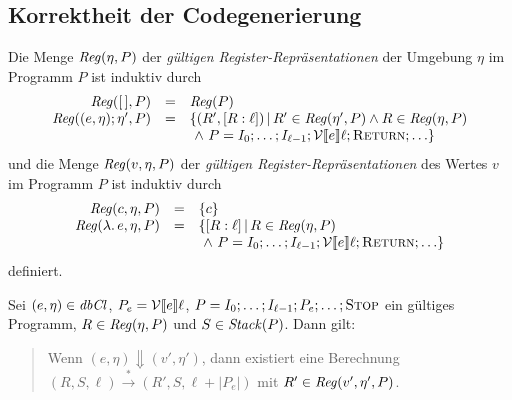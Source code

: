 \documentclass[12pt,fleqn]{article}
\begin{document}
\subsection{Korrektheit der Codegenerierung}

\begin{definition}
  Die Menge ${\text{\it Reg\/}}(\eta,P)$ der {\em g\"ultigen Register-Repr\"asentationen} der Umgebung $\eta$ im Programm $P$ ist
  induktiv durch
  \[\begin{array}{rcl}
    {\text{\it Reg\/}}([\,],P) &=& {\text{\it Reg\/}}(P) \\
    {\text{\it Reg\/}}((e,\eta);\eta',P) &=& \{(R',[R:\ell])\,|\,R'\in{\text{\it Reg\/}}(\eta',P) \wedge R\in{\text{\it Reg\/}}(\eta,P) \\
    && \ \wedge\ P = I_0;\ldots;I_{\ell-1};\mathcal{V}\llbracket e \rrbracket\ell;\textsc{Return};\ldots\}
  \end{array}\]
  und die Menge ${\text{\it Reg\/}}(v,\eta,P)$ der {\em g\"ultigen Register-Repr\"asentationen} des Wertes $v$ im Programm
  $P$ ist induktiv durch
  \[\begin{array}{rcl}
    {\text{\it Reg\/}}(c,\eta,P) &=& \{c\} \\
    {\text{\it Reg\/}}(\lambda .\,e,\eta,P) &=& \{[R:\ell]\,|\,R\in{\text{\it Reg\/}}(\eta,P) \\
    && \ \wedge\ P = I_0;\ldots;I_{\ell-1};\mathcal{V}\llbracket e \rrbracket\ell;\textsc{Return};\ldots\}
  \end{array}\]
  definiert.
\end{definition}

\begin{lemma}
  Sei $(e,\eta)\in{\text{\it dbCl\/}}$, $P_e=\mathcal{V}\llbracket e \rrbracket\ell$, $P=I_0;\ldots;I_{\ell-1};P_e;\ldots;\textsc{Stop}$
  ein g\"ultiges Programm, $R\in{\text{\it Reg\/}}(\eta,P)$ und $S\in{\text{\it Stack\/}}(P)$. Dann gilt:
  \begin{quote}
    Wenn $(e,\eta) \Downarrow (v',\eta')$, dann existiert eine Berechnung \\
    $(R,S,\ell) \xrightarrow* (R',S,\ell+|P_e|)$ mit $R'\in{\text{\it Reg\/}}(v',\eta',P)$.
  \end{quote}
\end{lemma}
\end{document}
